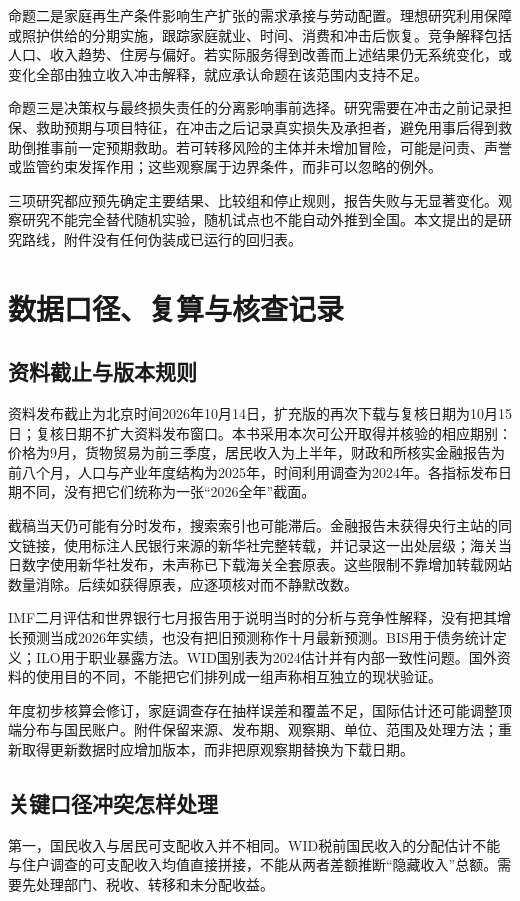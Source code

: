 \documentclass[UTF8,fontset=fandol,zihao=-4,oneside,openany]{ctexbook}
\begin{document}
命题二是家庭再生产条件影响生产扩张的需求承接与劳动配置。理想研究利用保障或照护供给的分期实施，跟踪家庭就业、时间、消费和冲击后恢复。竞争解释包括人口、收入趋势、住房与偏好。若实际服务得到改善而上述结果仍无系统变化，或变化全部由独立收入冲击解释，就应承认命题在该范围内支持不足。

命题三是决策权与最终损失责任的分离影响事前选择。研究需要在冲击之前记录担保、救助预期与项目特征，在冲击之后记录真实损失及承担者，避免用事后得到救助倒推事前一定预期救助。若可转移风险的主体并未增加冒险，可能是问责、声誉或监管约束发挥作用；这些观察属于边界条件，而非可以忽略的例外。

三项研究都应预先确定主要结果、比较组和停止规则，报告失败与无显著变化。观察研究不能完全替代随机实验，随机试点也不能自动外推到全国。本文提出的是研究路线，附件没有任何伪装成已运行的回归表。

\chapter{数据口径、复算与核查记录}
\section{资料截止与版本规则}
资料发布截止为北京时间2026年10月14日，扩充版的再次下载与复核日期为10月15日；复核日期不扩大资料发布窗口。本书采用本次可公开取得并核验的相应期别：价格为9月，货物贸易为前三季度，居民收入为上半年，财政和所核实金融报告为前八个月，人口与产业年度结构为2025年，时间利用调查为2024年。各指标发布日期不同，没有把它们统称为一张“2026全年”截面。

截稿当天仍可能有分时发布，搜索索引也可能滞后。金融报告未获得央行主站的同文链接，使用标注人民银行来源的新华社完整转载，并记录这一出处层级；海关当日数字使用新华社发布，未声称已下载海关全套原表。这些限制不靠增加转载网站数量消除。后续如获得原表，应逐项核对而不静默改数。

IMF二月评估和世界银行七月报告用于说明当时的分析与竞争性解释，没有把其增长预测当成2026年实绩，也没有把旧预测称作十月最新预测。BIS用于债务统计定义；ILO用于职业暴露方法。WID国别表为2024估计并有内部一致性问题。国外资料的使用目的不同，不能把它们排列成一组声称相互独立的现状验证。

年度初步核算会修订，家庭调查存在抽样误差和覆盖不足，国际估计还可能调整顶端分布与国民账户。附件保留来源、发布期、观察期、单位、范围及处理方法；重新取得更新数据时应增加版本，而非把原观察期替换为下载日期。

\section{关键口径冲突怎样处理}
第一，国民收入与居民可支配收入并不相同。WID税前国民收入的分配估计不能与住户调查的可支配收入均值直接拼接，不能从两者差额推断“隐藏收入”总额。需要先处理部门、税收、转移和未分配收益。
\end{document}
